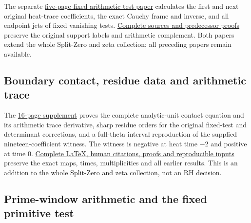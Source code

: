 \documentclass[
]{article}
\begin{document}
The separate
\href{https://github.com/KokunoYumeto/zeta-function-research-reader/blob/main/workbenches/splitzero-tandem/continuations/20260923-fixed-arithmetic-heat-flags/FIXED_ARITHMETIC_HEAT_FLAGS.pdf}{five-page
fixed arithmetic test paper} calculates the first and next original
heat-trace coefficients, the exact Cauchy frame and inverse, and all
endpoint jets of fixed vanishing tests.
\href{https://github.com/KokunoYumeto/zeta-function-research-reader/blob/main/workbenches/splitzero-tandem/continuations/20260923-fixed-arithmetic-heat-flags/README.md}{Complete
sources and predecessor proofs} preserve the original support labels and
arithmetic complement. Both papers extend the whole Split-Zero and zeta
collection; all preceding papers remain available.

\subsection{Boundary contact, residue data and arithmetic
trace}\label{boundary-contact-residue-data-and-arithmetic-trace}

The
\href{https://github.com/KokunoYumeto/zeta-function-research-reader/blob/main/workbenches/splitzero-tandem/continuations/20260923-boundary-residue-arithmetic/BOUNDARY_RESIDUE_ARITHMETIC_RECEIVERS.pdf}{16-page
supplement} proves the complete analytic-unit contact equation and its
arithmetic trace derivative, sharp residue orders for the original
fixed-test and determinant corrections, and a full-theta interval
reproduction of the supplied nineteen-coefficient witness. The witness
is negative at heat time −2 and positive at time 0.
\href{https://github.com/KokunoYumeto/zeta-function-research-reader/blob/main/workbenches/splitzero-tandem/continuations/20260923-boundary-residue-arithmetic/README.md}{Complete
LaTeX, human citations, proofs and reproducible inputs} preserve the
exact maps, times, multiplicities and all earlier results. This is an
addition to the whole Split-Zero and zeta collection, not an RH
decision.

\subsection{Prime-window arithmetic and the fixed primitive
test}\label{prime-window-arithmetic-and-the-fixed-primitive-test}
\end{document}
